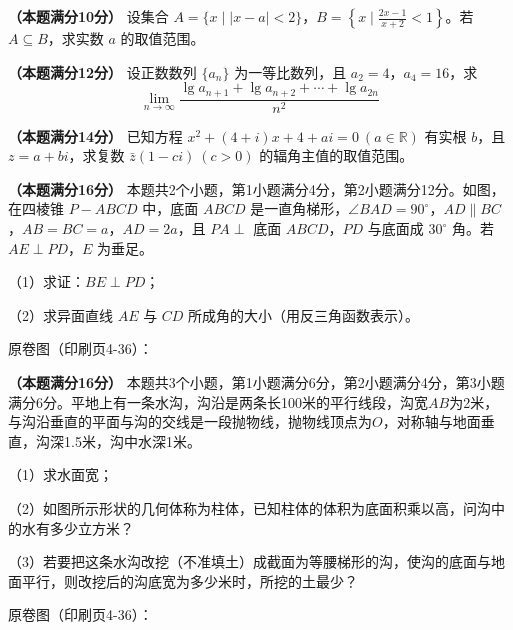 \begin{question}
\textbf{（本题满分10分）} 设集合 $A=\{x\mid |x-a|<2\}$，$B=\left\{x\mid\frac{2x-1}{x+2}<1\right\}$。若 $A\subseteq B$，求实数 $a$ 的取值范围。

\end{question}
\begin{question}
\textbf{（本题满分12分）} 设正数数列 $\{a_n\}$ 为一等比数列，且 $a_2=4$，$a_4=16$，求
\nopagebreak[4]
\[
\lim_{n\to\infty}\frac{\lg a_{n+1}+\lg a_{n+2}+\cdots+\lg a_{2n}}{n^2}
\]

\end{question}
\begin{question}
\textbf{（本题满分14分）} 已知方程 $x^2+(4+i)x+4+ai=0\ (a\in\mathbb R)$ 有实根 $b$，且 $z=a+bi$，求复数 $\bar z(1-ci)\ (c>0)$ 的辐角主值的取值范围。

\Needspace{0.4\textheight}
\end{question}
\begin{question}
\textbf{（本题满分16分）} 本题共2个小题，第1小题满分4分，第2小题满分12分。如图，在四棱锥 $P-ABCD$ 中，底面 $ABCD$ 是一直角梯形，$\angle BAD=90^\circ$，$AD\parallel BC$，$AB=BC=a$，$AD=2a$，且 $PA\perp$ 底面 $ABCD$，$PD$ 与底面成 $30^\circ$ 角。若 $AE\perp PD$，$E$ 为垂足。

（1）求证：$BE\perp PD$；

（2）求异面直线 $AE$ 与 $CD$ 所成角的大小（用反三角函数表示）。

原卷图（印刷页4-36）：
\nopagebreak[4]
\begin{center}\end{center}
\nopagebreak[4]
\Needspace{0.4\textheight}
\end{question}
\begin{question}
\textbf{（本题满分16分）} 本题共3个小题，第1小题满分6分，第2小题满分4分，第3小题满分6分。平地上有一条水沟，沟沿是两条长100米的平行线段，沟宽$AB$为2米，与沟沿垂直的平面与沟的交线是一段抛物线，抛物线顶点为$O$，对称轴与地面垂直，沟深1.5米，沟中水深1米。

（1）求水面宽；

（2）如图所示形状的几何体称为柱体，已知柱体的体积为底面积乘以高，问沟中的水有多少立方米？

（3）若要把这条水沟改挖（不准填土）成截面为等腰梯形的沟，使沟的底面与地面平行，则改挖后的沟底宽为多少米时，所挖的土最少？

原卷图（印刷页4-36）：
\nopagebreak[4]
\begin{center}\end{center}
\nopagebreak[4]
\end{question}
